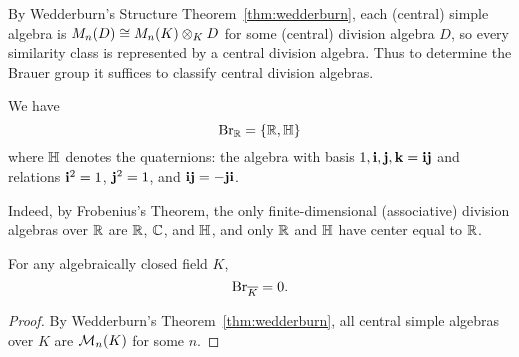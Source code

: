 By Wedderburn's Structure Theorem~\ref{thm:wedderburn}, each (central) simple algebra is $M_n(D)\cong M_n(K)\ot_K D$ for some (central) division algebra $D$, so every similarity class is represented by a central division algebra. Thus to determine the Brauer group it suffices to classify central division algebras.
\begin{ex}
We have
\[
\Br_{\R}=\{\R,\Hq\}
\]
where $\Hq$ denotes the quaternions: the algebra with basis $1,\vi,\vj,\vk=\vi\vj$ and relations $\vi^2=1$, $\vj^2=1$, and $\vi\vj=-\vj\vi$.

Indeed, by Frobenius's Theorem, the only finite-dimensional (associative) division algebras over $\R$ are $\R$, $\C$, and $\Hq$, and only $\R$ and $\Hq$ have center equal to $\R$.
\end{ex}
\begin{pr}
For any algebraically closed field $K$,
\[
\Br_{\ol K}=0.
\]
\end{pr}
\begin{proof}
By Wedderburn's Theorem~\ref{thm:wedderburn}, all central simple algebras over $K$ are $\cal M_n(K)$ for some $n$.
\end{proof}
